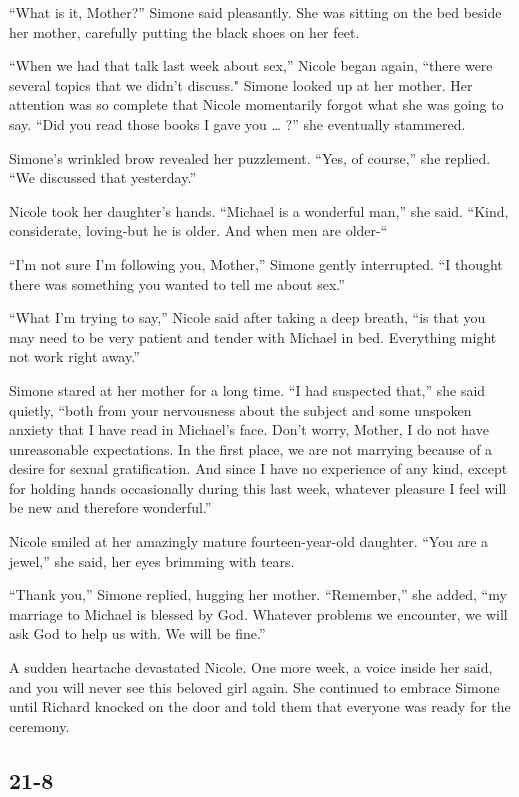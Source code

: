 \documentclass[]{article}
\begin{document}
{“What is it, Mother?” Simone said pleasantly.  She was sitting on the bed beside her mother, carefully putting the black shoes on her feet.

“When we had that talk last week about sex,” Nicole began again, “there were several topics that we didn’t discuss."  Simone looked up at her mother.  Her attention was so complete that Nicole momentarily forgot what she was going to say.  “Did you read those books I gave you … ?” she eventually stammered.

Simone’s wrinkled brow revealed her puzzlement.  “Yes, of course,” she replied.  “We discussed that yesterday.”

Nicole took her daughter’s hands.  “Michael is a wonderful man,” she said.  “Kind, considerate, loving-but he is older.  And when men are older-“

“I’m not sure I’m following you, Mother,” Simone gently interrupted.  “I thought there was something you wanted to tell me about sex.”

“What I’m trying to say,” Nicole said after taking a deep breath, “is that you may need to be very patient and tender with Michael in bed.  Everything might not work right away.”

Simone stared at her mother for a long time.  “I had suspected that,” she said quietly, “both from your nervousness about the subject and some unspoken anxiety that I have read in Michael’s face.  Don’t worry, Mother, I do not have unreasonable expectations.  In the first place, we are not marrying because of a desire for sexual gratification.  And since I have no experience of any kind, except for holding hands occasionally during this last week, whatever pleasure I feel will be new and therefore wonderful.”

Nicole smiled at her amazingly mature fourteen-year-old daughter.  “You are a jewel,” she said, her eyes brimming with tears.

“Thank you,” Simone replied, hugging her mother.  “Remember,” she added, “my marriage to Michael is blessed by God.  Whatever problems we encounter, we will ask God to help us with.  We will be fine.”

A sudden heartache devastated Nicole.  One more week, a voice inside her said, and you will never see this beloved girl again.  She continued to embrace Simone until Richard knocked on the door and told them that everyone was ready for the ceremony.

\subsection*{21-8}

}
\end{document}
